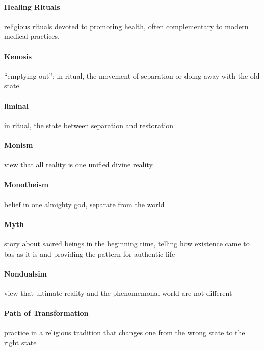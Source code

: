 \documentclass{article}
\begin{document}
\paragraph{Healing Rituals}
\label{par:healing_rituals}
religious rituals devoted to promoting health, often complementary to modern medical practices.

\paragraph{Kenosis}
\label{par:kenosis}
``emptying out''; in ritual, the movement of separation or doing away with the old state

\paragraph{liminal}
\label{par:liminal}
in ritual, the state between separation and restoration

\paragraph{Monism}
\label{par:monism}
view that all reality is one unified divine reality

\paragraph{Monotheism}
\label{par:monotheism}
belief in one almighty god, separate from the world

\paragraph{Myth}
\label{par:myth}
story about sacred beings in the beginning time, telling how existence came to bas as it is and providing the pattern for authentic life

\paragraph{Nondualsim}
\label{par:nondualsim}
view that ultimate reality and the phenomemonal world are not different

\paragraph{Path of Transformation}
\label{par:path_of_transformation}
practice in a religious tradition that changes one from the wrong state to the right state
\end{document}
